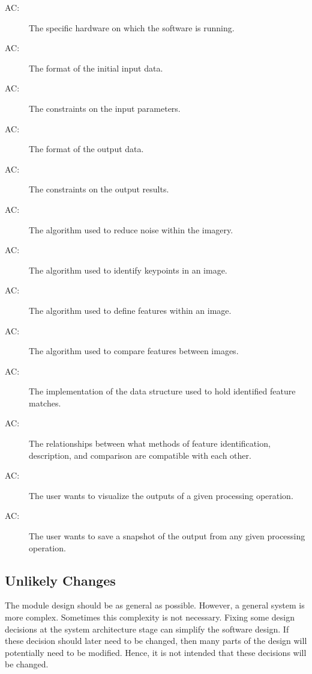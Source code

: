 \documentclass[12pt, titlepage]{article}
\newcounter{acnum}
\newcommand{\actheacnum}{AC\theacnum}
\begin{document}
\begin{description}
\item[ \actheacnum \label{acHardware}:] The specific
  hardware on which the software is running.
\item[ \actheacnum \label{acInput}:] The format of the
  initial input data.
\item[ \actheacnum \label{acInConstrain}:] The constraints 
on the input parameters.
\item[ \actheacnum \label{acOutput}:] The format of the 
output data.
\item[ \actheacnum \label{acOutConstrain}:] The constraints 
on the output results.
\item[ \actheacnum \label{acNoise}:] The algorithm used to 
reduce noise within the imagery.
\item[ \actheacnum \label{acKP}:] The algorithm used to 
identify keypoints in an image.
\item[ \actheacnum \label{acFD}:] The algorithm used to 
define features within an image.
\item[ \actheacnum \label{acFM}:] The algorithm used to 
compare features between images.
\item[ \actheacnum \label{acMatches}:] The implementation 
of the data structure used to hold identified feature matches.
\item[ \actheacnum \label{acRelation}:] The relationships 
between what methods of feature identification, description, and comparison are 
compatible with each other.
\item[ \actheacnum \label{acVisualize}:] The user wants 
to visualize the outputs of a given processing operation.
\item[ \actheacnum \label{acSaveImage}:] The user wants 
to save a snapshot of the output from any given processing operation.

\end{description}

\subsection{Unlikely Changes} \label{SecUchange}

The module design should be as general as possible. However, a general system is
more complex. Sometimes this complexity is not necessary. Fixing some design
decisions at the system architecture stage can simplify the software design. If
these decision should later need to be changed, then many parts of the design
will potentially need to be modified. Hence, it is not intended that these
decisions will be changed.
\end{document}
